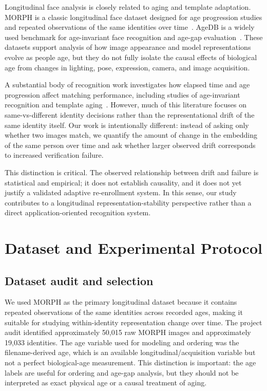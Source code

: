 \documentclass[conference]{IEEEtran}
\begin{document}
Longitudinal face analysis is closely related to aging and template adaptation. MORPH is a classic longitudinal face dataset designed for age progression studies and repeated observations of the same identities over time~\cite{ricanek2006morph}. AgeDB is a widely used benchmark for age-invariant face recognition and age-gap evaluation~\cite{moschoglou2017agedb}. These datasets support analysis of how image appearance and model representations evolve as people age, but they do not fully isolate the causal effects of biological age from changes in lighting, pose, expression, camera, and image acquisition.

A substantial body of recognition work investigates how elapsed time and age progression affect matching performance, including studies of age-invariant recognition and template aging~\cite{park2010age,han2013age}. However, much of this literature focuses on same-vs-different identity decisions rather than the representational drift of the same identity itself. Our work is intentionally different: instead of asking only whether two images match, we quantify the amount of change in the embedding of the same person over time and ask whether larger observed drift corresponds to increased verification failure.

This distinction is critical. The observed relationship between drift and failure is statistical and empirical; it does not establish causality, and it does not yet justify a validated adaptive re-enrollment system. In this sense, our study contributes to a longitudinal representation-stability perspective rather than a direct application-oriented recognition system.

\section{Dataset and Experimental Protocol}
\label{sec:dataset}
\subsection{Dataset audit and selection}
We used MORPH as the primary longitudinal dataset because it contains repeated observations of the same identities across recorded ages, making it suitable for studying within-identity representation change over time. The project audit identified approximately 50,015 raw MORPH images and approximately 19,033 identities. The age variable used for modeling and ordering was the filename-derived age, which is an available longitudinal/acquisition variable but not a perfect biological-age measurement. This distinction is important: the age labels are useful for ordering and age-gap analysis, but they should not be interpreted as exact physical age or a causal treatment of aging.
\end{document}
